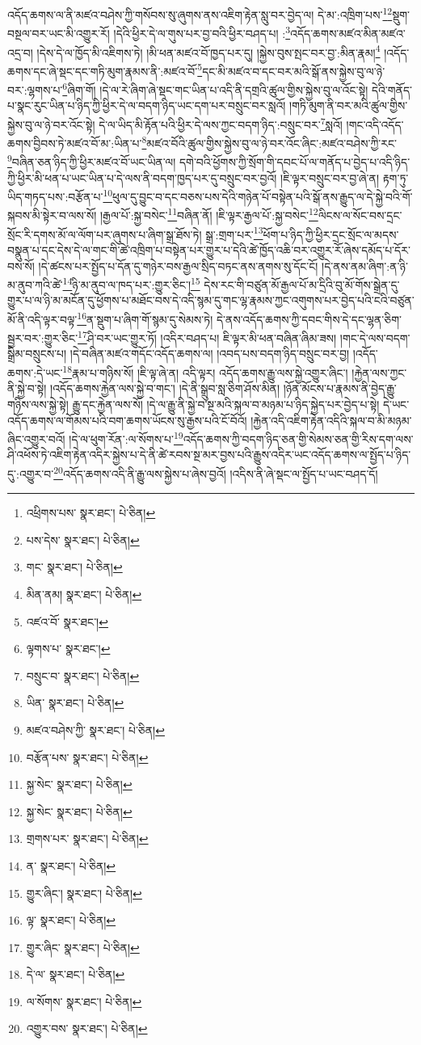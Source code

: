 འདོད་ཆགས་ལ་ནི་མཛའ་བཤེས་ཀྱི་གསོབས་སུ་ཞུགས་ནས་འཇིག་རྟེན་སླུ་བར་བྱེད་ལ། དེ་མ་:འཁྲིག་པས་\footnote{འཕྲིགས་པས་  སྣར་ཐང་།  པེ་ཅིན། }\footnote{པས་དེས་  སྣར་ཐང་།  པེ་ཅིན། }སྡུག་བསྔལ་བར་ཡང་མི་འགྱུར་རོ། །དེའི་ཕྱིར་དེ་ལ་གུས་པར་བྱ་བའི་ཕྱིར་བཤད་པ། :\footnote{གང་  སྣར་ཐང་།  པེ་ཅིན། }འདོད་ཆགས་མཛའ་མིན་མཛའ་འདྲ་བ། །དེས་དེ་ལ་ཁྱོད་མི་འཇིགས་ཏེ། །མི་ཕན་མཛའ་བོ་ཁྱད་པར་དུ། །སྐྱེས་བུས་སྤང་བར་བྱ་:མིན་རྣམ།\footnote{མིན་ནམ།  སྣར་ཐང་།  པེ་ཅིན། } །འདོད་ཆགས་དང་ཞེ་སྡང་དང་གཏི་མུག་རྣམས་ནི་:མཛའ་བོ་\footnote{འཛའ་བོ་  སྣར་ཐང་། }དང་མི་མཛའ་བ་དང་བར་མའི་སྒོ་ནས་སྐྱེས་བུ་ལ་ཉེ་བར་:ལྷགས་པ་\footnote{ལྟགས་པ་  སྣར་ཐང་། }ཞིག་གོ། །དེ་ལ་རེ་ཞིག་ཞེ་སྡང་གང་ཡིན་པ་འདི་ནི་དགྲའི་ཚུལ་གྱིས་སྐྱེས་བུ་ལ་འོང་སྟེ། དེའི་གནོད་པ་སྣང་རུང་ཡིན་པ་ཉིད་ཀྱི་ཕྱིར་དེ་ལ་བདག་ཉིད་ཡང་དག་པར་བསྲུང་བར་སླའོ། །གཏི་མུག་ནི་བར་མའི་ཚུལ་གྱིས་སྐྱེས་བུ་ལ་ཉེ་བར་འོང་སྟེ། དེ་ལ་ཡིད་མི་རྟོན་པའི་ཕྱིར་དེ་ལས་ཀྱང་བདག་ཉིད་:བསྲུང་བར་\footnote{བསྲུང་བ་  སྣར་ཐང་།  པེ་ཅིན། }སླའོ། །གང་འདི་འདོད་ཆགས་བྱིབས་ཏེ་མཛའ་བོ་མ་:ཡིན་པ་\footnote{ཡིན་  སྣར་ཐང་།  པེ་ཅིན། }མཛའ་བོའི་ཚུལ་གྱིས་སྐྱེས་བུ་ལ་ཉེ་བར་འོང་ཞིང་:མཛའ་བཤེས་ཀྱི་རང་\footnote{མཛའ་བཤེས་ཀྱི་  སྣར་ཐང་།  པེ་ཅིན། }བཞིན་ཅན་ཉིད་ཀྱི་ཕྱིར་མཛའ་བོ་ཡང་ཡིན་ལ། དགེ་བའི་ཕྱོགས་ཀྱི་སྲོག་གི་དབང་པོ་ལ་གནོད་པ་བྱེད་པ་འདི་ཉིད་ཀྱི་ཕྱིར་མི་ཕན་པ་ཡང་ཡིན་པ་དེ་ལས་ནི་བདག་ཁྱད་པར་དུ་བསྲུང་བར་བྱའོ། །ཇི་ལྟར་བསྲུང་བར་བྱ་ཞེ་ན། རྟག་ཏུ་ཡིད་གཏད་པས་:བརྩོན་པ་\footnote{བརྩོན་པས་  སྣར་ཐང་།  པེ་ཅིན། }ཕུལ་དུ་བྱུང་བ་དང་བཅས་པས་དེའི་གཉེན་པོ་བསྟེན་པའི་སྒོ་ནས་རྒྱུད་ལ་དེ་སྐྱེ་བའི་གོ་སྐབས་མི་སྟེར་བ་ལས་སོ། །རྒྱལ་པོ་:སྐྱ་བསེང་\footnote{སྐྱ་སེང་  སྣར་ཐང་།  པེ་ཅིན། }བཞིན་ནོ། །ཇི་ལྟར་རྒྱལ་པོ་:སྐྱ་བསེང་\footnote{སྐྱ་སེང་  སྣར་ཐང་།  པེ་ཅིན། }ལིངས་ལ་སོང་བས་དྲང་སྲོང་རི་དགས་མོ་ལ་ལོག་པར་ཞུགས་པ་ཞིག་སྒྲ་ཐོས་ཏེ། སྒྲ་:གྲག་པར་\footnote{གྲགས་པར་  སྣར་ཐང་།  པེ་ཅིན། }ཕོག་པ་ཉིད་ཀྱི་ཕྱིར་དྲང་སྲོང་ལ་མདས་བསྣུན་པ་དང་དེས་དེ་ལ་གང་གི་ཚེ་འཁྲིག་པ་བསྟེན་པར་གྱུར་པ་དེའི་ཚེ་ཁྱོད་འཆི་བར་འགྱུར་རོ་ཞེས་དམོད་པ་དོར་བས་སོ། །དེ་ཚངས་པར་སྤྱོད་པ་དོན་དུ་གཉེར་བས་རྒྱལ་སྲིད་བཏང་ནས་ནགས་སུ་དོང་ངོ། །དེ་ནས་ནམ་ཞིག་:ན་ཉི་མ་ནུབ་ཀའི་ཚེ་\footnote{ན་  སྣར་ཐང་།  པེ་ཅིན། }ཉི་མ་ནུབ་ལ་ཁད་པར་:གྱུར་ཅིང་།\footnote{གྱུར་ཞིང་།  སྣར་ཐང་།  པེ་ཅིན། } དེས་རང་གི་བཙུན་མོ་རྒྱལ་པོ་མ་དྲིའི་བུ་མོ་གོས་སྒྲེན་དུ་གྱུར་པ་ལ་ཉི་མ་མངོན་དུ་ཕྱོགས་པ་མཐོང་བས་དེ་འདི་སྙམ་དུ་གང་ལྷ་རྣམས་ཀྱང་འགུགས་པར་བྱེད་པའི་ངའི་བཙུན་མོ་ནི་འདི་ལྟར་བལྟ་\footnote{ལྟ་  སྣར་ཐང་།  པེ་ཅིན། }ན་སྡུག་པ་ཞིག་གོ་སྙམ་དུ་སེམས་ཏེ། དེ་ནས་འདོད་ཆགས་ཀྱི་དབང་གིས་དེ་དང་ལྷན་ཅིག་སྦྱར་བར་:གྱུར་ཅིང་\footnote{གྱུར་ཞིང་  སྣར་ཐང་།  པེ་ཅིན། }ཤི་བར་ཡང་གྱུར་ཏོ། །འདིར་བཤད་པ། ཇི་ལྟར་མི་ཕན་བཞིན་ཞིམ་ཟས། །གང་དེ་ལས་བདག་སྒྲིམ་བསྲུངས་པ། །དེ་བཞིན་མཛའ་གདོང་འདོད་ཆགས་ལ། །འབད་པས་བདག་ཉིད་བསྲུང་བར་བྱ། །འདོད་ཆགས་:དེ་ཡང་\footnote{དེ་ལ་  སྣར་ཐང་།  པེ་ཅིན། }རྣམ་པ་གཉིས་སོ། །ཇི་ལྟ་ཞེ་ན། འདི་ལྟར། འདོད་ཆགས་རྒྱུ་ལས་སྐྱེ་འགྱུར་ཞིང་། །རྐྱེན་ལས་ཀྱང་ནི་སྐྱེ་བ་སྟེ། །འདོད་ཆགས་རྐྱེན་ལས་སྐྱེ་བ་གང་། །དེ་ནི་སྒྲུབ་སླ་ཅིག་ཤོས་མིན། །ཉོན་མོངས་པ་རྣམས་ནི་བྱེད་རྒྱུ་གཉིས་ལས་སྐྱེ་སྟེ། རྒྱུ་དང་རྐྱེན་ལས་སོ། །དེ་ལ་རྒྱུ་ནི་སྐྱེ་བ་སྔ་མའི་སྐལ་བ་མཉམ་པ་ཉིད་སྐྱེད་པར་བྱེད་པ་སྟེ། དེ་ཡང་འདོད་ཆགས་ལ་གོམས་པའི་བག་ཆགས་ཡོངས་སུ་རྒྱས་པའི་ངོ་བོའོ། །རྐྱེན་འདི་འཇིག་རྟེན་འདིའི་སྐལ་བ་མི་མཉམ་ཞིང་འགྱུར་བའོ། །དེ་ལ་ཕུག་རོན་:ལ་སོགས་པ་\footnote{ལ་སོགས་  སྣར་ཐང་།  པེ་ཅིན། }འདོད་ཆགས་ཀྱི་བདག་ཉིད་ཅན་གྱི་སེམས་ཅན་གྱི་རིས་དག་ལས་ཤི་འཕོས་ཏེ་འཇིག་རྟེན་འདིར་སྐྱེས་པ་དེ་ནི་ཚེ་རབས་སྔ་མར་བྱས་པའི་རྒྱུས་འདིར་ཡང་འདོད་ཆགས་ལ་སྤྱོད་པ་ཉིད་དུ་:འགྱུར་བ་\footnote{འགྱུར་བས་  སྣར་ཐང་།  པེ་ཅིན། }འདོད་ཆགས་འདི་ནི་རྒྱུ་ལས་སྐྱེས་པ་ཞེས་བྱའོ། །འདིས་ནི་ཞེ་སྡང་ལ་སྤྱོད་པ་ཡང་བཤད་དོ། 